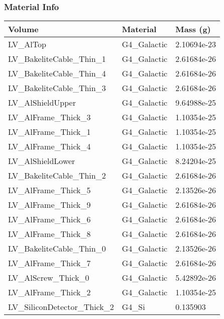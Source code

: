 \documentclass[8pt]{beamer}
\begin{document}
            \begin{frame}
                \frametitle{Material Info}
            
            \begin{table}
            \begin{tabular}{lll}
             Volume & Material & Mass (g) \\
                    
            \midrule
            LV\_AlTop & G4\_Galactic & 2.10694e-23\\
                        LV\_BakeliteCable\_Thin\_1 & G4\_Galactic & 2.61684e-26\\
                        LV\_BakeliteCable\_Thin\_4 & G4\_Galactic & 2.61684e-26\\
                        LV\_BakeliteCable\_Thin\_3 & G4\_Galactic & 2.61684e-26\\
                        LV\_AlShieldUpper & G4\_Galactic & 9.64988e-25\\
                        LV\_AlFrame\_Thick\_3 & G4\_Galactic & 1.10354e-25\\
                        LV\_AlFrame\_Thick\_1 & G4\_Galactic & 1.10354e-25\\
                        LV\_AlFrame\_Thick\_4 & G4\_Galactic & 1.10354e-25\\
                        LV\_AlShieldLower & G4\_Galactic & 8.24204e-25\\
                        LV\_BakeliteCable\_Thin\_2 & G4\_Galactic & 2.61684e-26\\
                        LV\_AlFrame\_Thick\_5 & G4\_Galactic & 2.13526e-26\\
                        LV\_AlFrame\_Thick\_9 & G4\_Galactic & 2.61684e-26\\
                        LV\_AlFrame\_Thick\_6 & G4\_Galactic & 2.61684e-26\\
                        LV\_AlFrame\_Thick\_8 & G4\_Galactic & 2.61684e-26\\
                        LV\_BakeliteCable\_Thin\_0 & G4\_Galactic & 2.13526e-26\\
                        LV\_AlFrame\_Thick\_7 & G4\_Galactic & 2.61684e-26\\
                        LV\_AlScrew\_Thick\_0 & G4\_Galactic & 5.42892e-26\\
                        LV\_AlFrame\_Thick\_2 & G4\_Galactic & 1.10354e-25\\
                        LV\_SiliconDetector\_Thick\_2 & G4\_Si & 0.135903\\

\end{tabular}
\end{table}
\end{frame}
\end{document}
